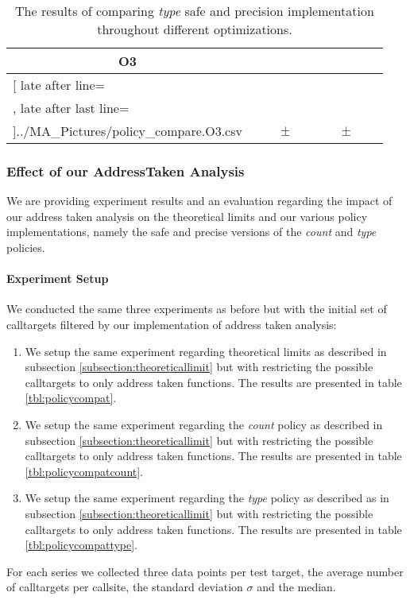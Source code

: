 \begin{table}[!htbp]
{\begin{tabular}{l|c|rcl|c|rcl|c}
\multicolumn{1}{c}{\bfseries O3}
	\\\midrule
	\csvreader[ late after line=\\, late after last line=\\\bottomrule]{../MA_Pictures/policy_compare.O3.csv}{
}
	{\csvcolii  &  \csvcoliii & \csvcolxiii & $\pm$ & \csvcolxiv & \csvcolxv & \csvcolxvi & $\pm$ & \csvcolxvii& \csvcolxviii}%

    	\end{tabular}
}
		\caption {The results of comparing \textit{type} safe and precision implementation throughout different optimizations.}
		\label{tbl:policycomptype}
\end{table}

\newpage


\subsubsection{Effect of our AddressTaken Analysis}
\label{subsection:effectivenessaddresstaken}
We are providing experiment results and an evaluation regarding the impact of our address taken analysis on the theoretical limits and our various policy implementations, namely the safe and precise versions of the \textit{count} and \textit{type} policies.
\paragraph{Experiment Setup} We conducted the same three experiments as before but with the initial set of calltargets filtered by our implementation of address taken analysis:
\begin{enumerate}
\item We setup the same experiment regarding theoretical limits as described in subsection \ref{subsection:theoreticallimit} but with restricting the possible calltargets to only address taken functions. The results are presented in table \ref{tbl:policycompat}.
\item We setup the same experiment regarding the \textit{count} policy as described in subsection \ref{subsection:theoreticallimit} but with restricting the possible calltargets to only address taken functions. The results are presented in table \ref{tbl:policycompatcount}.
\item We setup the same experiment regarding the \textit{type} policy as described as in subsection \ref{subsection:theoreticallimit} but with restricting the possible calltargets to only address taken functions. The results are presented in table \ref{tbl:policycompattype}.
\end{enumerate}
For each series we collected three data points per test target, the average number of calltargets per callsite, the standard deviation $\sigma$ and the median.

